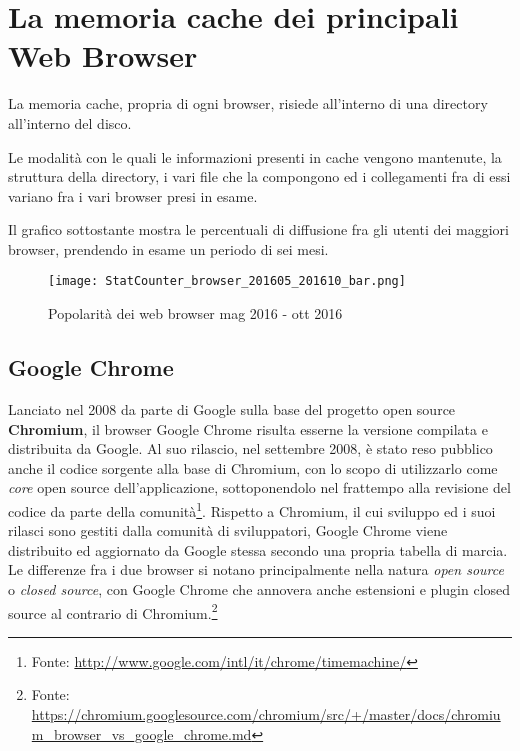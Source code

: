 \chapter{La memoria cache dei principali Web Browser}

La memoria cache, propria di ogni browser, risiede all'interno di una directory all'interno del disco. 

Le modalità con le quali le informazioni presenti in cache vengono mantenute, la struttura della directory, i vari file che la compongono ed i collegamenti fra di essi variano fra i vari browser presi in esame. 

Il grafico sottostante mostra le percentuali di diffusione fra gli utenti dei maggiori browser, prendendo in esame un periodo di sei mesi.

\begin{figure}[htpb]
	\begin{center}
		\texttt{[image: StatCounter\_browser\_201605\_201610\_bar.png]}
	\end{center}
\caption[Popolarità dei web browsers mag 2016 - ott 2016]{Popolarità dei web browser mag 2016 - ott 2016\footnotemark}
\end{figure}

\section{Google Chrome}

Lanciato nel 2008 da parte di Google sulla base del progetto open source \textbf{Chromium}, il browser Google Chrome risulta esserne la versione compilata e distribuita da Google.
Al suo rilascio, nel settembre 2008, è stato reso pubblico anche il codice sorgente alla base di Chromium, con lo scopo di utilizzarlo come \textit{core} open source dell'applicazione, sottoponendolo nel frattempo alla revisione del codice da parte della comunità\footnote{Fonte: \url{http://www.google.com/intl/it/chrome/timemachine/}}. 
Rispetto a Chromium, il cui sviluppo ed i suoi rilasci sono gestiti dalla comunità di sviluppatori, Google Chrome viene distribuito ed aggiornato da Google stessa secondo una propria tabella di marcia.
Le differenze fra i due browser si notano principalmente nella natura \textit{open source} o \textit{closed source}, con Google Chrome che annovera anche estensioni e plugin closed source al contrario di Chromium.\footnote{Fonte:    \url{https://chromium.googlesource.com/chromium/src/+/master/docs/chromium_browser_vs_google_chrome.md}}

